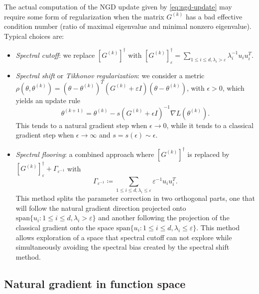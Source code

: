 \documentclass{article}
\theoremstyle{noparens}
\newcommand{\paramk}{\theta^{(k)}}
\newcommand{\paramkp}{\theta^{(k+1)}}
\begin{document}
The actual computation of the NGD update given by \eqref{eq:ngd-update} may require some form of regularization when the matrix $G^{(k)}$ has a bad effective condition number (ratio of maximal eigenvalue and minimal nonzero eigenvalue). Typical choices are:
\begin{itemize}
    \item \textit{Spectral cutoff}: we replace $[G^{(k)}]^\dagger$ with $[G^{(k)}]^\dagger_\varepsilon = \sum_{1\le i \le d, \lambda_i > \varepsilon} \lambda_i^{-1} u_i u_i^T$.
    \item \textit{Spectral shift} or \textit{Tikhonov regularization}: we consider a metric $\rho(\theta , \paramk) = (\theta-\paramk)^T (G^{(k)} + \varepsilon I)(\theta - \paramk)$, with $\epsilon>0$, which yields   an update rule
    $$
    \paramkp = \paramk - s (G^{(k)} + \epsilon I)^{-1} \nabla L(\paramk).
    $$
    This tends to a natural gradient step when $\epsilon \to 0$, while it tends to a classical gradient step when $\epsilon \to \infty$ and $s = s(\epsilon) \sim  \epsilon.$
    \item \textit{Spectral flooring}: a combined approach where $[G^{(k)}]^\dagger$ is replaced by $[G^{(k)}]^\dagger_\varepsilon + \Gamma_{\varepsilon^{-1}}$ with
    $$\Gamma_{\varepsilon^{-1}}\coloneqq \sum_{1\le i \le d, \lambda_i \leq \varepsilon} \varepsilon^{-1} u_i u_i^T.$$
    This method splits the parameter correction in two orthogonal parts, one that will follow the natural gradient direction projected onto $\mathrm{span}\{ u_i:1\le i \le d, \lambda_i > \varepsilon\}$ and another following the projection of the classical gradient onto the space $\mathrm{span}\{u_i:1\le i \le d, \lambda_i \leq \varepsilon\}$. This method allows exploration of a space that spectral cutoff can not  explore  while simultaneously avoiding the spectral bias created by the spectral shift method.
\end{itemize}








\subsection{Natural gradient in function space}
\label{sec:flow}
\end{document}
